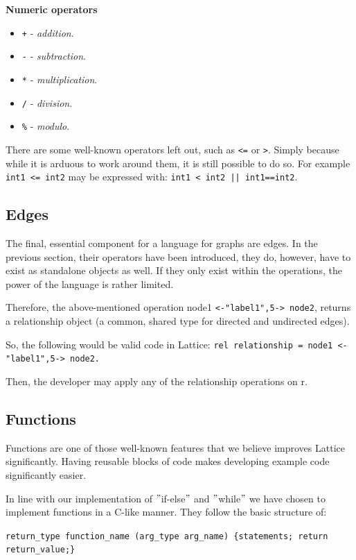 \textbf{Numeric operators}
\begin{itemize}
    \item \lstinline{+} - \emph{addition}.
    \item \lstinline{-} - \emph{subtraction}.
    \item \lstinline{*} - \emph{multiplication}.
    \item \lstinline{/} - \emph{division}.
    \item \lstinline{%} - \emph{modulo}.
\end{itemize}

There are some well-known operators left out, such as \lstinline{<=} or \lstinline{>}.
Simply because while it is arduous to work around them, it is still possible to do so.
For example  \lstinline{int1 <= int2} may be expressed with:  \lstinline{int1 < int2 || int1==int2}.

\subsection{Edges}\label{subsec:syntax_edges}
The final, essential component for a language for graphs are edges.
In the previous section, their operators have been introduced,
they do, however, have to exist as standalone objects as well.
If they only exist within the operations, the power of the language is rather
limited.

Therefore, the above-mentioned operation node1 \lstinline{<-"label1",5-> node2}, returns a relationship object (a common, shared
type for directed and undirected edges).

So, the following would be valid code in Lattice: \lstinline{rel relationship = node1 <-"label1",5-> node2.}

Then, the developer may apply any of the relationship operations on r.

\subsection{Functions}\label{subsec:syntax_functions}
Functions are one of those well-known features that we believe improves Lattice significantly.
Having reusable blocks of code makes developing example code significantly easier.

In line with our implementation of \("\)if-else\("\) and \("\)while\("\) we have chosen to implement functions in a C-like manner.
They follow the basic structure of:

\lstinline|return_type function_name (arg_type arg_name) {statements; return return_value;}|


